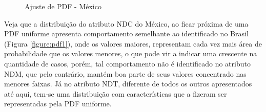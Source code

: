 \documentclass[a4paper,12pt]{article}
\begin{document}
\begin{figure}[H]
\captionsetup[subfigure]{labelformat=empty}
\caption{Ajuste de PDF - México}
\qquad
{}
\qquad
\centering
{}
\label{figure:pdf4}
\end{figure}

\par Veja que a distribuição do atributo NDC do México, ao ficar próxima de uma PDF uniforme apresenta comportamento semelhante ao identificado no Brasil (Figura \ref{figure:pdf1}), onde os valores maiores, representam cada vez mais área de probabilidade que os valores menores, o que pode vir a indicar uma crescente na quantidade de casos, porém, tal comportamento não é identificado no atributo NDM, que pelo contrário, mantém boa parte de seus valores concentrado nas menores faixas. Já no atributo NDT, diferente de todos os outros apresentados até aqui, tem-se uma distribuição com características que a fizeram ser representadas pela PDF uniforme.
\end{document}

